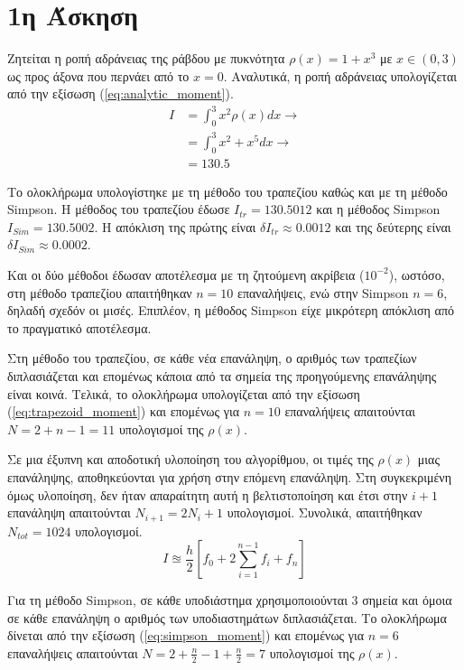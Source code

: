 \documentclass[assignment4.tex]{subfiles}
\begin{document}
\section*{1η Άσκηση}
Ζητείται η ροπή αδράνειας της ράβδου με πυκνότητα $\rho(x) = 1+x^3$ με $x\in(0,3)$ ως προς άξονα που περνάει από το $x=0$. Αναλυτικά, η ροπή αδράνειας υπολογίζεται από την εξίσωση (\ref{eq:analytic_moment}).
\begin{equation}
\begin{split}
I &= \int_{0}^{3} x^2\rho(x) dx \rightarrow \\
&= \int_{0}^{3} x^2 + x^5 dx \rightarrow \\
&= 130.5
\end{split}
\label{eq:analytic_moment}
\end{equation}

Το ολοκλήρωμα υπολογίστηκε με τη μέθοδο του τραπεζίου καθώς και με τη μέθοδο \textlatin{Simpson}. Η μέθοδος του τραπεζίου έδωσε $I_{tr}=130.5012$ και η μέθοδος \textlatin{Simpson} $I_{Sim}=130.5002$. Η απόκλιση της πρώτης είναι $\delta I_{tr}\approx0.0012$ και της δεύτερης είναι $\delta I_{Sim}\approx0.0002$. 

Και οι δύο μέθοδοι έδωσαν αποτέλεσμα με τη ζητούμενη ακρίβεια ($10^{-2}$), ωστόσο, στη μέθοδο τραπεζίου απαιτήθηκαν $n=10$ επαναλήψεις, ενώ στην \textlatin{Simpson} $n=6$, δηλαδή σχεδόν οι μισές. Επιπλέον, η μέθοδος \textlatin{Simpson} είχε μικρότερη απόκλιση από το πραγματικό αποτέλεσμα.

Στη μέθοδο του τραπεζίου, σε κάθε νέα επανάληψη, ο αριθμός των τραπεζίων διπλασιάζεται και επομένως κάποια από τα σημεία της προηγούμενης επανάληψης είναι κοινά. Τελικά, το ολοκλήρωμα υπολογίζεται από την εξίσωση (\ref{eq:trapezoid_moment}) και επομένως για $n=10$ επαναλήψεις απαιτούνται $N=2+n-1=11$ υπολογισμοί της $\rho(x)$. 

Σε μια έξυπνη και αποδοτική υλοποίηση του αλγορίθμου, οι τιμές της $\rho(x)$ μιας επανάληψης, αποθηκεύονται για χρήση στην επόμενη επανάληψη. Στη συγκεκριμένη όμως υλοποίηση, δεν ήταν απαραίτητη αυτή η βελτιστοποίηση και έτσι στην $i+1$ επανάληψη απαιτούνται $Ν_{i+1} = 2Ν_i + 1$ υπολογισμοί. Συνολικά, απαιτήθηκαν $Ν_{tot}=1024$ υπολογισμοί.
\begin{equation}
I \approxeq \frac{h}{2}\left[ f_0 + 2\sum_{i=1}^{n-1}f_i + f_n \right]
\label{eq:trapezoid_moment}
\end{equation}

Για τη μέθοδο \textlatin{Simpson}, σε κάθε υποδιάστημα χρησιμοποιούνται 3 σημεία και όμοια σε κάθε επανάληψη ο αριθμός των υποδιαστημάτων διπλασιάζεται. Το ολοκλήρωμα δίνεται από την εξίσωση (\ref{eq:simpson_moment}) και επομένως για $n=6$ επαναλήψεις απαιτούνται $N=2+\frac{n}{2}-1+\frac{n}{2}=7$ υπολογισμοί της $\rho(x)$.
\end{document}
